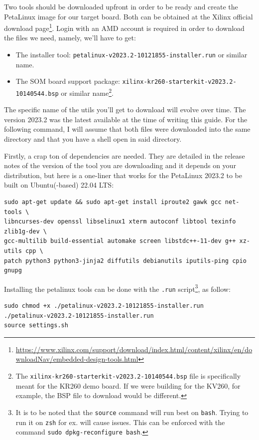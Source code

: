 \documentclass[10pt]{article}
\begin{document}
Two tools should be downloaded upfront in order to be ready and create the
PetaLinux image for our target board. Both can be obtained at the Xilinx
official download page\footnote{\url{https://www.xilinx.com/support/download/index.html/content/xilinx/en/downloadNav/embedded-design-tools.html}}. Login with an AMD account is required in order to
download the files we need, namely, we'll have to get:
\begin{itemize}
\item The installer tool: \texttt{petalinux-v2023.2-10121855-installer.run} or similar name.
\item The SOM board support package: \texttt{xilinx-kr260-starterkit-v2023.2-10140544.bsp} or similar name\footnote{The \texttt{xilinx-kr260-starterkit-v2023.2-10140544.bsp} file is specifically
meant for the KR260 demo board. If we were building for the KV260, for example,
the BSP file to download would be different.}.
\end{itemize}
The specific name of the utils you'll get to download will evolve over time.
The version 2023.2 was the latest available at the time of writing this guide.
For the following command, I will assume that both files were downloaded into
the same directory and that you have a shell open in said directory.

Firstly, a crap ton of dependencies are needed. They are detailed in the
release notes of the version of the tool you are downloading and it depends on
your distribution, but here is a one-liner that works for the PetaLinux 2023.2
to be built on Ubuntu(-based) 22.04 LTS:

\begin{verbatim}
sudo apt-get update && sudo apt-get install iproute2 gawk gcc net-tools \
libncurses-dev openssl libselinux1 xterm autoconf libtool texinfo zlib1g-dev \
gcc-multilib build-essential automake screen libstdc++-11-dev g++ xz-utils cpp \
patch python3 python3-jinja2 diffutils debianutils iputils-ping cpio gnupg
\end{verbatim}

Installing the petalinux tools can be done with the \texttt{.run} script\footnote{It is to be noted that the \texttt{source} command will run best on \texttt{bash}. Trying
to run it on \texttt{zsh} for ex. will cause issues. This can be enforced with the
command \texttt{sudo dpkg-reconfigure bash}.}, as follow:
\begin{verbatim}
sudo chmod +x ./petalinux-v2023.2-10121855-installer.run
./petalinux-v2023.2-10121855-installer.run
source settings.sh
\end{verbatim}
\end{document}
